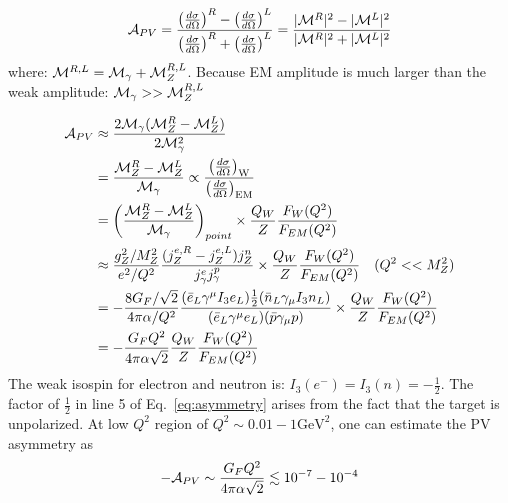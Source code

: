 \begin{equation}
    \mathcal{A}_{PV} = \frac{\left( \frac{d\sigma}{d\Omega} \right)^R - \left( \frac{d\sigma}{d\Omega} \right)^L}
    {\left( \frac{d\sigma}{d\Omega} \right)^R + \left( \frac{d\sigma}{d\Omega} \right)^L}
    = \frac{|\mathcal{M}^R|^2 - |\mathcal{M}^L|^2}{|\mathcal{M}^R|^2 + |\mathcal{M}^L|^2}
\end{equation}
where: $\mathcal{M}^{R, L} = \mathcal{M}_{\gamma} + \mathcal{M}_Z^{R,L}$. Because EM amplitude is much 
larger than the weak amplitude: $\mathcal{M}_\gamma >> \mathcal{M}_Z^{R, L}$

\begin{equation}
    \begin{aligned}
	\mathcal{A}_{PV} &\approx \frac{2\mathcal{M}_\gamma (\mathcal{M}_Z^R - \mathcal{M}_Z^L)}{2\mathcal{M}^2_\gamma}	\\
	    &= \frac{\mathcal{M}_Z^R - \mathcal{M}_Z^L}{\mathcal{M}_\gamma} \propto \frac{\left( \frac{d\sigma}{d\Omega} \right)_{\text{W}}}{\left( \frac{d\sigma}{d\Omega} \right)_{\text{EM}}}	\\
	    &= \left(\frac{\mathcal{M}_Z^R - \mathcal{M}_Z^L}{\mathcal{M}_\gamma}\right)_{point} \times \frac{Q_{W}}{Z}\frac{F_{W}(Q^2)}{F_{EM}(Q^2)}    \\
	    &\approx \frac{g^2_Z/M_Z^2}{e^2/Q^2} \frac{(j_Z^{e,R} - j_Z^{e,L}) j_Z^n}{j_\gamma^e j_\gamma^p}
		\times \frac{Q_{W}}{Z}\frac{F_{W}(Q^2)}{F_{EM}(Q^2)} 	\quad (Q^2 << M_Z^2) \\
	    &= -\frac{8G_F/\sqrt{2}}{4\pi\alpha/Q^2} 
		\frac{(\bar{e}_L\gamma^\mu I_3e_L) \frac{1}{2}(\bar{n}_L \gamma_\mu I_3 n_L)}{(\bar{e}_L\gamma^\mu e_L)(\bar{p}\gamma_\mu p)}
		\times \frac{Q_{W}}{Z}\frac{F_{W}(Q^2)}{F_{EM}(Q^2)}    \\
	    &= -\frac{G_F Q^2}{4\pi\alpha\sqrt{2}} \frac{Q_{W}}{Z}\frac{F_{W}(Q^2)}{F_{EM}(Q^2)}
    \end{aligned}
    \label{eq:asymmetry}
\end{equation}
The weak isospin for electron and neutron is: $I_3(e^-) = I_3(n) = -\frac{1}{2}$.
The factor of $\frac{1}{2}$ in line 5 of Eq.~\ref{eq:asymmetry} arises from
the fact that the target is unpolarized. At low $Q^2$ region of $Q^2 \sim 0.01 - 1 \mathrm{GeV} ^2$,
one can estimate the PV asymmetry as 
\begin{equation}
    -\mathcal{A}_{PV} \sim \frac{G_F Q^2}{4\pi\alpha \sqrt{2}} \lesssim 10^{-7} - 10^{-4}
\end{equation}

